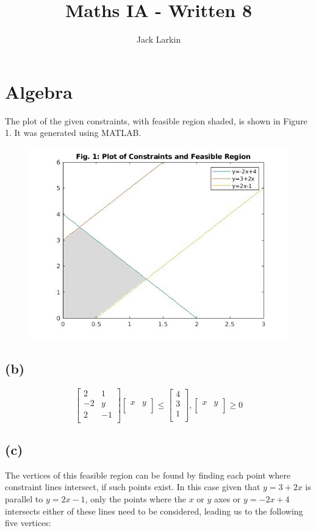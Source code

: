 \documentclass[11pt]{article}
\title{\textbf{Maths IA - Written 8}}
\date{}
\author{Jack Larkin}
\begin{document}
\maketitle
\section*{Algebra}
The plot of the given constraints, with feasible region shaded, is shown in Figure 1. It was generated using MATLAB.
\begin{figure}[h]
\includegraphics[scale=2.7]{plot1}
\end{figure}
\subsection*{(b)}
$$\begin{bmatrix}
2 &1 \\
-2 &y \\
2 &-1 \\
\end{bmatrix}
\begin{bmatrix}
x & y\\

\end{bmatrix}
\leq
\begin{bmatrix}
4\\
3\\
1\\
\end{bmatrix},
\begin{bmatrix}
x & y\\
\end{bmatrix}
\geq 0$$
\subsection*{(c)}
The vertices of this feasible region can be found by finding each point where constraint lines intersect, if such points exist. In this case given that $y=3+2x$ is parallel to $y=2x-1$, only the points where the $x$ or $y$ axes or $y=-2x+4$ intersects either of these lines need to be considered, leading us to the following five vertices:
\\
\end{document}

